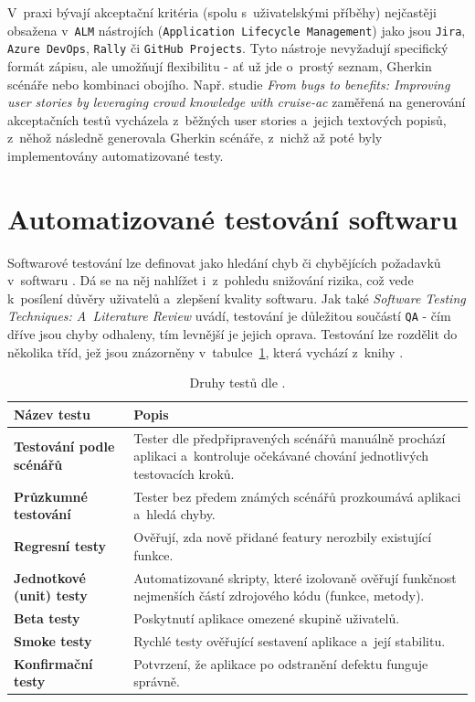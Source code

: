 \documentclass[czech, ing, kiv, he, iso690numb, viewonly]{fasthesis}
\begin{document}
V~praxi bývají akceptační kritéria (spolu s~uživatelskými příběhy) nejčastěji obsažena v~\texttt{ALM} nástrojích (\texttt{Application Lifecycle Management}) 
jako jsou \texttt{Jira}, \texttt{Azure DevOps}, \texttt{Rally} či \texttt{GitHub Projects}. Tyto nástroje nevyžadují specifický formát zápisu, ale umožňují flexibilitu - ať už jde o~prostý seznam, Gherkin scénáře nebo 
kombinaci obojího. Např. studie \textit{From bugs to benefits: Improving user stories by leveraging crowd knowledge with cruise-ac} \cite{schwedt2025bugs} zaměřená na generování akceptačních testů vycházela z~běžných user stories a~jejich 
textových popisů, z~něhož následně generovala Gherkin scénáře, z~nichž až poté byly implementovány automatizované testy.

\section{Automatizované testování softwaru}
Softwarové testování lze definovat jako hledání chyb či chybějících požadavků v~softwaru \cite{7814898swtesting}. Dá se na něj 
nahlížet i~z~pohledu snižování rizika, což vede k~posílení důvěry uživatelů a~zlepšení kvality softwaru. Jak také \textit{Software Testing Techniques: A~Literature Review} \cite{7814898swtesting} uvádí,
testování je důležitou součástí \texttt{QA} - čím dříve jsou chyby odhaleny, tím levnější je jejich oprava. Testování lze rozdělit 
do několika tříd, jež jsou znázorněny v~tabulce~\ref{tab:druhy_testu}, která vychází z~knihy \cite{herout_testovani_programatory}.

\begin{table}[H]
\centering
\begin{tabular}{|l|p{10cm}|}
\hline
\textbf{Název testu} & \textbf{Popis} \\ \hline
\textbf{Testování podle scénářů} & Tester dle předpřipravených scénářů manuálně prochází aplikaci a~kontroluje očekávané chování jednotlivých testovacích kroků. \\ \hline
\textbf{Průzkumné testování} & Tester bez předem známých scénářů prozkoumává aplikaci a~hledá chyby. \\ \hline
\textbf{Regresní testy} & Ověřují, zda nově přidané featury nerozbily existující funkce. \\ \hline
\textbf{Jednotkové (unit) testy} & Automatizované skripty, které izolovaně ověřují funkčnost nejmenších částí zdrojového kódu (funkce, metody). \\ \hline
\textbf{Beta testy} & Poskytnutí aplikace omezené skupině uživatelů. \\ \hline
\textbf{Smoke testy} & Rychlé testy ověřující sestavení aplikace a~její stabilitu. \\ \hline
\textbf{Konfirmační testy} & Potvrzení, že aplikace po odstranění defektu funguje správně. \\ \hline
\end{tabular}
\caption{Druhy testů dle \cite{herout_testovani_programatory}.}
\label{tab:druhy_testu}
\end{table}
\end{document}
